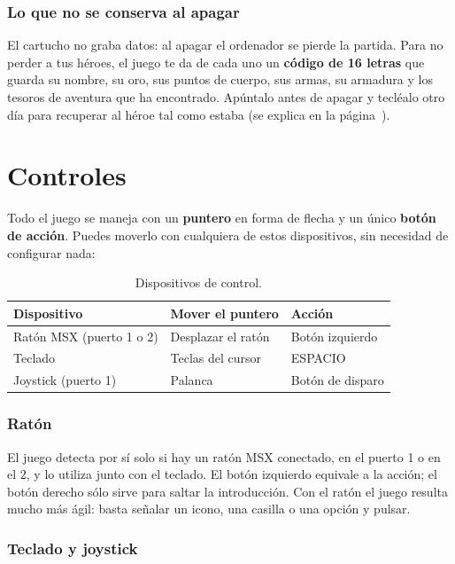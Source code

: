 \subsection{Lo que no se conserva al apagar}


El cartucho no graba datos: al apagar el ordenador se pierde la partida.
Para no perder a tus héroes, el juego te da de cada uno un \textbf{código de
16 letras} que guarda su nombre, su oro, sus puntos de cuerpo, sus armas, su
armadura y los tesoros de aventura que ha encontrado. Apúntalo antes de
apagar y tecléalo otro día para recuperar al héroe tal como estaba (se
explica en la página~\pageref{sec:codigos}).

\chapter{Controles}
\label{cap:controles}

Todo el juego se maneja con un \textbf{puntero} en forma de flecha y un
único \textbf{botón de acción}. Puedes moverlo con cualquiera de estos
dispositivos, sin necesidad de configurar nada:

\begin{table}[H]\centering\small
\begin{tabularx}{\linewidth}{@{}lLL@{}}
\toprule
\textbf{Dispositivo} & \textbf{Mover el puntero} & \textbf{Acción}\\
\midrule
Ratón MSX (puerto 1 o 2) & Desplazar el ratón & Botón izquierdo\\
Teclado & Teclas del cursor & ESPACIO\\
Joystick (puerto 1) & Palanca & Botón de disparo\\
\bottomrule
\end{tabularx}
\caption{Dispositivos de control.}
\end{table}

\subsection{Ratón}

El juego detecta por sí solo si hay un ratón MSX conectado, en el puerto 1
o en el 2, y lo utiliza junto con el teclado. El botón izquierdo equivale a
la acción; el botón derecho sólo sirve para saltar la introducción. Con el
ratón el juego resulta mucho más ágil: basta señalar un icono, una casilla
o una opción y pulsar.

\subsection{Teclado y joystick}

